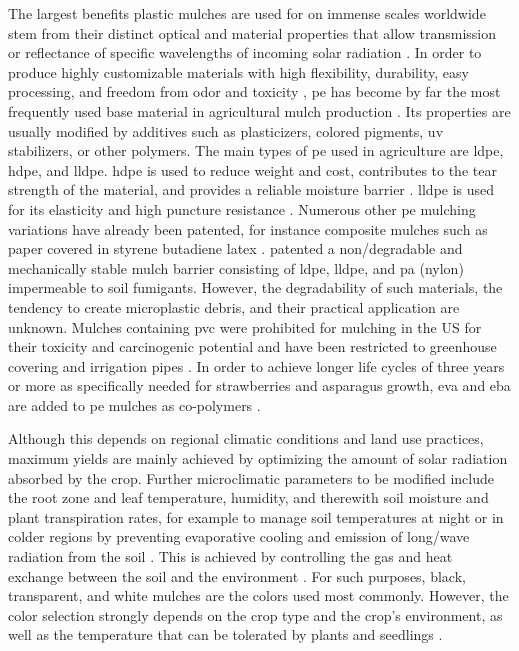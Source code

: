 The largest benefits plastic mulches are used for on immense scales worldwide stem from their distinct optical and material properties that allow transmission or reflectance of specific wavelengths of incoming solar radiation \citep{BrownBlack2001,Chalker-ScottImpact2007,CsizinszkyColor1995,GordonPlastic2008,HaynesUse1987}. In order to produce highly customizable materials with high flexibility, durability, easy processing, and freedom from odor and toxicity \citep{WrightIns2019}, \ac{pe} has become by far the most frequently used base material in agricultural mulch production \citep{Diaz-PerezBell2010,KaraEffects2013,LocascioRed2005,SivanNew2011}. Its properties are usually modified by additives such as plasticizers, colored pigments, \ac{uv} stabilizers, or other polymers. The main types of \ac{pe} used in agriculture are \ac{ldpe}, \ac{hdpe}, and \ac{lldpe}.
\Ac{hdpe} is used to reduce weight and cost, contributes to the tear strength of the material, and provides a reliable moisture barrier \citep{LamontPlastics2005}. \Ac{lldpe} is used for its elasticity and high puncture resistance \citep{AnthonyMultilayer1983}. Numerous other \ac{pe} mulching variations have already been patented, for instance composite mulches such as paper covered in styrene butadiene latex \citep{DalebrouxMulching1997}.
\citet{SabbaghAgricultural2010} patented a non\-/degradable and mechanically stable mulch barrier consisting of \ac{ldpe}, \ac{lldpe}, and \ac{pa} (nylon) impermeable to soil fumigants. However, the degradability of such materials, the tendency to create microplastic debris, and their practical application are unknown. Mulches containing \ac{pvc} were prohibited for mulching in the US for their toxicity and carcinogenic potential \citep{USEPAGuidelines2012} and have been restricted to greenhouse covering and irrigation pipes \citep{Scarascia-MugnozzaPlastic2011}. In order to achieve longer life cycles of three years or more \citep{BrucknerSpargelanbau2008} as specifically needed for strawberries and asparagus growth, \ac{eva} and \ac{eba} are added to \ac{pe} mulches as co-polymers \citep{EspiPlastic2006}.

Although this depends on regional climatic conditions and land use practices, maximum yields are mainly achieved by optimizing the amount of solar radiation absorbed by the crop. Further microclimatic parameters to be modified include the root zone and leaf temperature, humidity, and therewith soil moisture and plant transpiration rates, for example to manage soil temperatures at night or in colder regions by preventing evaporative cooling and emission of long\-/wave radiation from the soil \citep{HamOptical1993}. This is achieved by controlling the gas and heat exchange between the soil and the environment \citep{LamontPlastic1993,TararaMicroclimate2000}. For such purposes, black, transparent, and white mulches are the colors used most commonly. However, the color selection strongly depends on the crop type and the crop's environment, as well as the temperature that can be tolerated by plants and seedlings \citep{LamontPlastic1993,TararaMicroclimate2000}.

